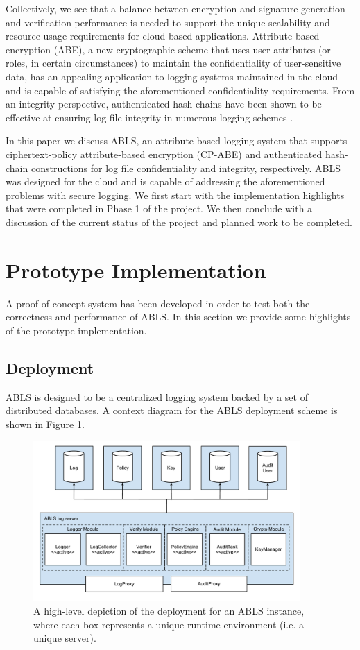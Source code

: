 \documentclass{sig-alternate}
\begin{document}
Collectively, we see that a balance between encryption and signature generation and verification performance is
needed to support the unique scalability and resource usage requirements for cloud-based applications.
Attribute-based encryption (ABE), a new cryptographic scheme that uses user attributes (or roles, in certain 
circumstances) to maintain the confidentiality of user-sensitive data, has an appealing application
to logging systems maintained in the cloud and is capable of satisfying the aforementioned confidentiality 
requirements. From an integrity perspective, authenticated hash-chains have been shown to be effective 
at ensuring log file integrity in numerous logging schemes  \cite{Schneier1999-Secure}. 

In this paper we discuss ABLS, an attribute-based logging system that supports ciphertext-policy 
attribute-based encryption (CP-ABE) \cite{Bethencourt2007-CPABE} and authenticated hash-chain 
constructions for log file confidentiality and integrity, respectively. ABLS was designed for
the cloud and is capable of addressing the aforementioned problems with secure logging. 
We first start with the implementation highlights that were completed in Phase 1 of the project. We then
conclude with a discussion of the current status of the project and planned work to be completed.

\section{Prototype Implementation}
A proof-of-concept system has been developed in order to test both the correctness and performance of ABLS. 
In this section we provide some highlights of the prototype implementation.

\subsection{Deployment}
\label{sec:deployment}
ABLS is designed to be a centralized logging system backed by a set of distributed databases. A context
diagram for the ABLS deployment scheme is shown in Figure \ref{fig:deployment}.

\begin{figure}[htb!]
\begin{center}
\includegraphics[width=4in]{images/deployment.pdf}
\caption{A high-level depiction of the deployment for an ABLS instance, where each box represents a unique runtime environment (i.e. a unique server).}
\label{fig:deployment}
\end{center}
\end{figure}
\end{document}
